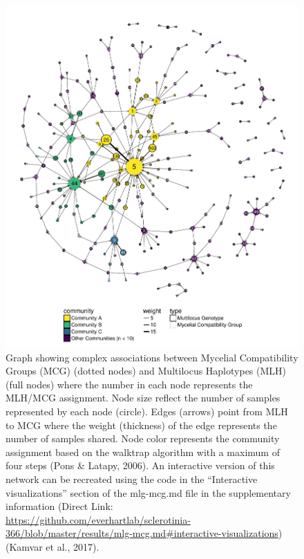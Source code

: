 \documentclass[fleqn,10pt,lineno]{wlpeerj} %
\theoremstyle{definition}
\theoremstyle{definition}
\theoremstyle{definition}
\theoremstyle{remark}
\begin{document}
\begin{figure}
\centering
\includegraphics[width=1.00000\textwidth]{../../results/figures/publication/full-graph.pdf}
\caption{Graph showing complex associations between Mycelial
Compatibility Groups (MCG) (dotted nodes) and Multilocus Haplotypes
(MLH) (full nodes) where the number in each node represents the MLH/MCG
assignment. Node size reflect the number of samples represented by each
node (circle). Edges (arrows) point from MLH to MCG where the weight
(thickness) of the edge represents the number of samples shared. Node
color represents the community assignment based on the walktrap
algorithm with a maximum of four steps (Pons \& Latapy, 2006). An
interactive version of this network can be recreated using the code in
the ``Interactive visualizations'' section of the mlg-mcg.md file in the
supplementary information (Direct Link:
\url{https://github.com/everhartlab/sclerotinia-366/blob/master/results/mlg-mcg.md\#interactive-visualizations})
(Kamvar et al., 2017).}\label{fullgraph}
\end{figure}
\end{document}
